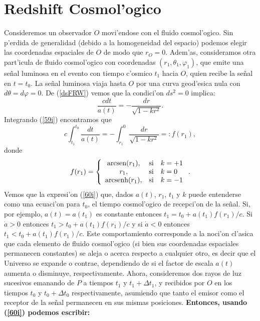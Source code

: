 \section{Redshift Cosmol'ogico}
Consideremos un observador $O$ movi'endose con el fluido cosmol'ogico. Sin p'erdida de generalidad (debido a la
homogeneidad del espacio) podemos elegir las coordenadas espaciales de $O$ de modo que $r_O=0$. Adem'as, consideramos 
otra part'icula de fluido cosmol'ogico con coordenadas $(r_1,\theta_1,\varphi_1)$, que emite una se\~nal luminosa en el
evento con tiempo c'osmico $t_1$ hacia $O$, quien recibe la se\~nal en $t=t_0$. La se\~nal luminosa viaja hasta $O$ por 
una curva geod'esica nula con $d\theta=d\varphi=0$. De (\ref{dsFRW}) vemos que la condici'on $ds^2=0$ implica:
\begin{equation}
\frac{cdt}{a(t)}=-\frac{dr}{\sqrt{1-kr^2}}. \label{59i}
\end{equation}
Integrando (\ref{59i}) encontramos que
\begin{equation}
c\int_{t_1}^{t_0}\frac{dt}{a(t)}=-\int_{r_1}^{0}\frac{dr}{\sqrt{1-kr^2}}=:f(r_1), \label{60i}%
\end{equation}
donde
\begin{equation}
f(r_1)=\left\{
\begin{array}
[c]{ccl}%
\text{arcsen}(r_1), &\text{si}& k=+1\\
r_1, &\text{si}& k=0\\
\text{arcsenh} (r_1), &\text{si}& k=-1
\end{array}
\right. . \label{61i}%
\end{equation}
Vemos que la expresi'on (\ref{60i}) que, dados $a(t)$, $r_1$, $t_1$ y $k$ puede entenderse como 
una ecuaci'on para $t_0$, el tiempo cosmol'ogico de recepci'on de la se\~nal. Si, por ejemplo, $a(t)=a(t_1)$ es 
constante entonces $t_1=t_0+a(t_1)f(r_1)/c$. Si $\dot{a}>0$ entonces $t_1>t_0+a(t_1)f(r_1)/c$ y si $\dot{a}<0$ 
entonces $t_1<t_0+a(t_1)f(r_1)/c$. Este comportamiento corresponde a la noci'on cl'asica que cada elemento de 
fluido cosmol'ogico (si bien sus coordenadas espaciales permanecen constantes) se aleja o acerca respecto a cualquier 
otro, es decir que el Universo se expande o contrae, dependiendo de si el factor de escala $a(t)$ aumenta o disminuye, 
respectivamente.
Ahora, consideremos dos rayos de luz sucesivos emanando de $P$ a tiempos
$t_1$ y $t_1+\Delta t_1$, y recibidos por $O$ en los tiempos $t_0$ y
$t_0+\Delta t_0$ respectivamente, asumiendo que tanto el emisor como el receptor  de la se\~nal permanecen en sus
mismas posiciones. \textbf{Entonces, usando (\ref{60i}) podemos escribir:}
